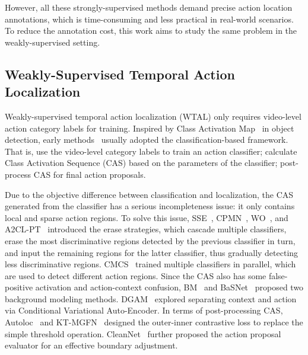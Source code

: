 \documentclass[journal]{IEEEtran}
\begin{document}
However, all these strongly-supervised methods demand precise action location annotations, which is time-consuming and less practical in real-world scenarios. To reduce the annotation cost, this work aims to study the same problem in the weakly-supervised setting.



\subsection{Weakly-Supervised Temporal Action Localization}
Weakly-supervised temporal action localization (WTAL) only requires video-level action category labels for training. Inspired by Class Activation Map~\cite{zhou2016learning} in object detection, early methods~\cite{wang2017untrimmednets,paul2018w,nguyen2018weakly} usually adopted the classification-based framework. That is, use the video-level category labels to train an action classifier; calculate Class Activation Sequence (CAS) based on the parameters of the classifier; post-process CAS for final action proposals. 


Due to the objective difference between classification and localization, the CAS generated from the classifier has a serious incompleteness issue: it only contains local and sparse action regions. To solve this issue, SSE~\cite{zhong2018step}, CPMN~\cite{su2018cascaded}, WO~\cite{zeng2019breaking}, and A2CL-PT~\cite{min2020adversarial} introduced the erase strategies, which cascade multiple classifiers, erase the most discriminative regions detected by the previous classifier in turn, and input the remaining regions for the latter classifier, thus gradually detecting less discriminative regions. CMCS~\cite{liu2019completeness} trained multiple classifiers in parallel, which are used to detect different action regions. Since the CAS also has some false-positive activation and action-context confusion, BM~\cite{nguyen2019weakly} and BaSNet~\cite{lee2019background} proposed two background modeling methods. DGAM~\cite{shi2020weakly} explored separating context and action via Conditional Variational Auto-Encoder. In terms of post-processing CAS, Autoloc~\cite{shou2018autoloc} and KT-MGFN~\cite{su2020transferable} designed the outer-inner contrastive loss to replace the simple threshold operation. CleanNet~\cite{liu2019weakly} further proposed the action proposal evaluator for an effective boundary adjustment. 
\end{document}
